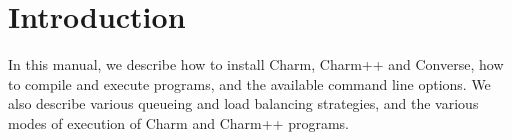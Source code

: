 \newpage
\pagestyle{headings}

\section{Introduction}
In this manual, we describe how to install Charm, Charm++ and
Converse, how to compile and execute programs, and the available
command line options.  We also describe various queueing and load balancing
strategies, and the various modes of execution of Charm and Charm++ programs.






